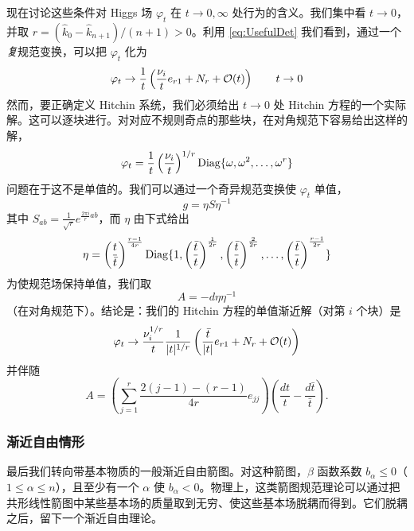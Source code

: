 现在讨论这些条件对 Higgs 场 $\varphi_t$ 在 $t\to 0,\infty$ 处行为的含义。我们集中看 $t\to 0$，并取 $r = (\hat k_0-\hat k_{n+1})/(n+1)>0$。利用 \eqref{eq:UsefulDet} 我们看到，通过一个\emph{复}规范变换，可以把 $\varphi_t$ 化为
\begin{equation} \label{eq:phi-formal}
\varphi_t \to \frac{1}{t} \left( \frac{\nu_i}{t} e_{r1} + N_r +
\mathcal{O}(t) \right) \qquad t \to 0 \end{equation}
然而，要正确定义 Hitchin 系统，我们必须给出 $t\to 0$ 处 Hitchin 方程的一个实际解。这可以逐块进行。对对应不规则奇点的那些块，在对角规范下容易给出这样的解，
\begin{equation}\label{eq:ch05-diagformal}
\varphi_t = \frac{1}{t} \left(\frac{\nu_i}{t}\right)^{1/r} {\rm
Diag} \{ \omega, \omega^2, \dots, \omega^r \}
\end{equation}
问题在于这不是单值的。我们可以通过一个奇异规范变换使 $\varphi_t$ 单值，
\begin{equation}\label{eq:ch05-gaugeeta}
g = \eta S \eta^{-1}
\end{equation}
其中 $S_{ab} = \frac{1}{\sqrt{r}} e^{\frac{2\pi i }{r} ab}$，而 $\eta$ 由下式给出
\begin{equation}\label{eq:ch05-eta}
\eta = \left(\frac{t}{\bar t} \right)^{\frac{r-1}{4r}} {\rm Diag}\{
1,\left(\frac{\bar t}{ t} \right)^{\frac{1}{2r}},\left(\frac{\bar
t}{ t} \right)^{\frac{2}{2r}},\dots, \left(\frac{\bar t}{ t}
\right)^{\frac{r-1}{2r}} \}
\end{equation}
为使规范场保持单值，我们取
\begin{equation}\label{eq:ch05-Aeta}
A = - d\eta \eta^{-1}
\end{equation}
（在对角规范下）。结论是：我们的 Hitchin 方程的单值渐近解（对第 $i$ 个块）是
\begin{equation}\label{eq:ISPatInfty}
\varphi_t \to \frac{\nu_i^{1/r}}{t} \frac{1}{\vert t\vert^{1/r}}
\left( \frac{\bar t}{\vert t\vert } e_{r1} + N_r + \mathcal{O}(t) \right)
\end{equation}
并伴随
\begin{equation}\label{eq:GaugeFldInfty}
A  =  \left( \sum_{j=1}^r \frac{2(j-1)-(r-1)}{4r} e_{jj} \right)
\left( \frac{dt}{t} - \frac{d\bar t}{\bar t}\right).
\end{equation}

\subsubsection{渐近自由情形}

最后我们转向带基本物质的一般渐近自由箭图。对这种箭图，$\beta$ 函数系数 $b_{\alpha} \leq 0$（$1\leq \alpha \leq n$），且至少有一个 $\alpha$ 使 $b_\alpha<0$。物理上，这类箭图规范理论可以通过把共形线性箭图中某些基本场的质量取到无穷、使这些基本场脱耦而得到。它们脱耦之后，留下一个渐近自由理论。

